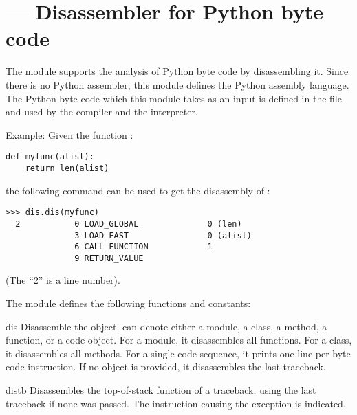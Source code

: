 \section{ ---
         Disassembler for Python byte code}



The  module supports the analysis of Python byte code by
disassembling it.  Since there is no Python assembler, this module
defines the Python assembly language.  The Python byte code which
this module takes as an input is defined in the file 
 and used by the compiler and the interpreter.

Example: Given the function :

\begin{verbatim}
def myfunc(alist):
    return len(alist)
\end{verbatim}

the following command can be used to get the disassembly of
:

\begin{verbatim}
>>> dis.dis(myfunc)
  2           0 LOAD_GLOBAL              0 (len)
              3 LOAD_FAST                0 (alist)
              6 CALL_FUNCTION            1
              9 RETURN_VALUE
\end{verbatim}

(The ``2'' is a line number).

The  module defines the following functions and constants:

\begin{funcdesc}{dis}{}
Disassemble the  object.  can denote
either a module, a class, a method, a function, or a code object.  
For a module, it disassembles all functions.  For a class,
it disassembles all methods.  For a single code sequence, it prints
one line per byte code instruction.  If no object is provided, it
disassembles the last traceback.
\end{funcdesc}

\begin{funcdesc}{distb}{}
Disassembles the top-of-stack function of a traceback, using the last
traceback if none was passed.  The instruction causing the exception
is indicated.
\end{funcdesc}

